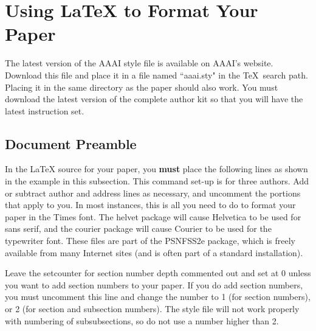 \documentclass[letterpaper]{article}
\begin{document}
\section{Using \LaTeX{} to Format Your Paper}

The latest version of the AAAI style file is available on AAAI's website. Download this file and place it in a file named ``aaai.sty" in the \TeX\ search path. Placing it in the same directory as the paper should also work. You must download the latest version of the complete author kit so that you will have the latest instruction set.

\subsection{Document Preamble}

In the \LaTeX{} source for your paper, you \textbf{must} place the following lines as shown in the example in this subsection. This command set-up is for three authors. Add or subtract author and address lines as necessary, and uncomment the portions that apply to you. In most instances, this is all you need to do to format your paper in the Times font. The helvet package will cause Helvetica to be used for sans serif, and the courier package will cause Courier to be used for the typewriter font. These files are part of the PSNFSS2e package, which is freely available from many Internet sites (and is often part of a standard installation).

Leave the setcounter for section number depth commented out and set at 0 unless you want to add section numbers to your paper. If you do add section numbers, you must uncomment this line and change the number to 1 (for section numbers), or 2 (for section and subsection numbers). The style file will not work properly with numbering of subsubsections, so do not use a number higher than 2.
\end{document}
